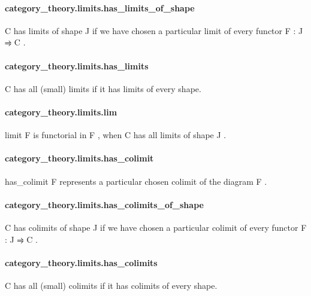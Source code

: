 \documentclass{article}
\begin{document}
\paragraph{category\_theory.limits.has\_limits\_of\_shape}
\par
\colorbox[RGB]{253,246,227}{{{{\color[RGB]{101, 123, 131} C }}}} has limits of shape 
\colorbox[RGB]{253,246,227}{{{{\color[RGB]{101, 123, 131} J }}}} if we have chosen a particular limit of
every functor 
\colorbox[RGB]{253,246,227}{{{{\color[RGB]{101, 123, 131} F : J ⥤ C }}}}.
\paragraph{category\_theory.limits.has\_limits}
\par
\colorbox[RGB]{253,246,227}{{{{\color[RGB]{101, 123, 131} C }}}} has all (small) limits if it has limits of every shape.
\paragraph{category\_theory.limits.lim}
\par
\colorbox[RGB]{253,246,227}{{{{\color[RGB]{101, 123, 131} limit F }}}} is functorial in 
\colorbox[RGB]{253,246,227}{{{{\color[RGB]{101, 123, 131} F }}}}, when 
\colorbox[RGB]{253,246,227}{{{{\color[RGB]{101, 123, 131} C }}}} has all limits of shape 
\colorbox[RGB]{253,246,227}{{{{\color[RGB]{101, 123, 131} J }}}}.
\paragraph{category\_theory.limits.has\_colimit}
\par
\colorbox[RGB]{253,246,227}{{{{\color[RGB]{101, 123, 131} has\_colimit F }}}} represents a particular chosen colimit of the diagram 
\colorbox[RGB]{253,246,227}{{{{\color[RGB]{101, 123, 131} F }}}}.
\paragraph{category\_theory.limits.has\_colimits\_of\_shape}
\par
\colorbox[RGB]{253,246,227}{{{{\color[RGB]{101, 123, 131} C }}}} has colimits of shape 
\colorbox[RGB]{253,246,227}{{{{\color[RGB]{101, 123, 131} J }}}} if we have chosen a particular colimit of
every functor 
\colorbox[RGB]{253,246,227}{{{{\color[RGB]{101, 123, 131} F : J ⥤ C }}}}.
\paragraph{category\_theory.limits.has\_colimits}
\par
\colorbox[RGB]{253,246,227}{{{{\color[RGB]{101, 123, 131} C }}}} has all (small) colimits if it has colimits of every shape.
\end{document}
